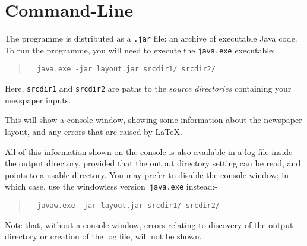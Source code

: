 \documentclass[a4paper,DIV=11]{scrartcl}
\begin{document}
\section*{Command-Line}

The programme is distributed as a \verb!.jar! file: an archive of
executable Java code. To run the programme, you will need to execute
the \verb!java.exe! executable:

\begin{quote}
\begin{verbatim}
  java.exe -jar layout.jar srcdir1/ srcdir2/
\end{verbatim}
\end{quote}

Here, \verb!srcdir1! and \verb!srcdir2! are paths to the
\textit{source directories} containing your newspaper inputs.

This will show a console window, showing some information about the
newspaper layout, and any errors that are raised by \LaTeX.

All of this information shown on the console is also available in a
log file inside the output directory, provided that the output
directory setting can be read, and points to a usable directory. You
may prefer to disable the console window; in which case, use the
windowless version~\texttt{java.exe} instead:-

\begin{quote}
\begin{verbatim}
  javaw.exe -jar layout.jar srcdir1/ srcdir2/
\end{verbatim}
\end{quote}

Note that, without a console window, errors relating to discovery of
the output directory or creation of the log file, will not be shown.
\end{document}
